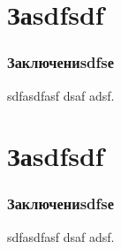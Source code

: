 \documentclass[14pt,aspectratio=43]{beamer}
\begin{document}
\begin{frame}
\begin{figure}[H]
\begin{minipage}[h]{0.7\linewidth}
\end{minipage}
\end{figure}

\end{frame}

\section{Заsdfsdf}\label{codfnclusion}
\begin{frame}[<alignment>]
\frametitle{Заключениsdfsе}

sdfasdfasf
dsaf
adsf.


\end{frame}	


\section{Заsdfsdf}\label{codfnclusion}
\begin{frame}[<alignment>]
\frametitle{Заключениsdfsе}

sdfasdfasf
dsaf
adsf.


\end{frame}	



\setcounter{framenumber}{\value{finalframe}}
\end{document}
